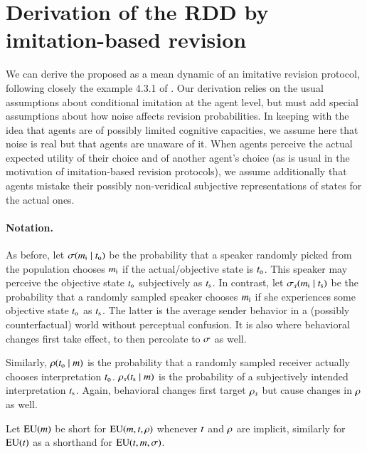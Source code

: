 \documentclass[fleqn,reqno,10pt]{article}
\newcommand{\rdd}{\acro{rdd}} %
\begin{document}
\section{Derivation of the RDD by imitation-based revision}
\label{sec:deriv-rdd-imit}

We can derive the proposed \rdd as a mean dynamic of an imitative revision protocol, following
closely the example 4.3.1 of \citet{Sandholm2010:Population-Game}. Our derivation relies on the
usual assumptions about conditional imitation at the agent level, but must add special
assumptions about how noise affects revision probabilities. In keeping with the idea that
agents are of possibly limited cognitive capacities, we assume here that noise is real but that
agents are unaware of it. When agents perceive the actual expected utility of their choice and
of another agent's choice (as is usual in the motivation of imitation-based revision
protocols), we assume additionally that agents mistake their possibly non-veridical subjective
representations of states for the actual ones.

\paragraph{Notation.} As before, let $\sigma(m_{\mathrm{i}} \mid t_{\mathrm{o}})$ be the
probability that a speaker randomly picked from the population chooses $m_{\mathrm{i}}$ if the
actual/objective state is $t_{\mathrm{o}}$. This speaker may perceive the objective state
$t_{\mathrm{o}}$ subjectively as $t_{\mathrm{s}}$. In contrast, let $\sigma_s(m_{\mathrm{i}} \mid
t_{\mathrm{s}})$ be the probability that a randomly sampled speaker chooses $m_{\mathrm{i}}$ if she
experiences some objective state $t_{\mathrm{o}}$ as $t_{\mathrm{s}}$. The latter is the average
sender behavior in a (possibly counterfactual) world without perceptual confusion. It is also
where behavioral changes first take effect, to then percolate to $\sigma$ as well.

Similarly, $\rho(t_{\mathrm{o}} \mid m)$ is the probability that a randomly sampled
receiver actually chooses interpretation $t_{\mathrm{o}}$. $\rho_s(t_{\mathrm{s}} \mid
m)$ is the probability of a subjectively intended interpretation $t_{\mathrm{s}}$. Again,
behavioral changes first target $\rho_s$ but cause changes in $\rho$ as well.

Let $\mathrm{EU}(m)$ be short for $\mathrm{EU}(m,t,\rho)$ whenever
$t$ and $\rho$ are implicit, similarly for $\mathrm{EU}(t)$ as a
shorthand for $\mathrm{EU}(t,m,\sigma)$.
\end{document}
